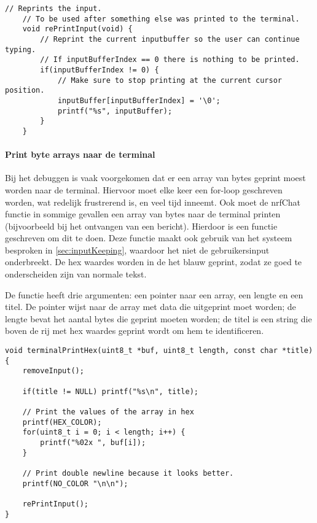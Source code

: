 \begin{lstlisting}[caption={De huidige input van de gebruiker opnieuw printen},captionpos=b,label={lst:reprintInput},style=c,xleftmargin=.\textwidth,xrightmargin=.\textwidth]
    // Reprints the input.
    // To be used after something else was printed to the terminal.
    void rePrintInput(void) {
        // Reprint the current inputbuffer so the user can continue typing.
        // If inputBufferIndex == 0 there is nothing to be printed.
        if(inputBufferIndex != 0) {
            // Make sure to stop printing at the current cursor position.
            inputBuffer[inputBufferIndex] = '\0';
            printf("%s", inputBuffer);
        }
    }
\end{lstlisting}

\paragraph{Print byte arrays naar de terminal}\label{sec:printStrex}
Bij het debuggen is vaak voorgekomen dat er een array van bytes geprint moest worden naar de terminal. Hiervoor moet elke keer een for-loop geschreven worden, wat redelijk frustrerend is, en veel tijd inneemt. Ook moet de nrfChat functie in sommige gevallen een array van bytes naar de terminal printen (bijvoorbeeld bij het ontvangen van een bericht). Hierdoor is een functie geschreven om dit te doen. Deze functie maakt ook gebruik van het systeem besproken in \autoref{sec:inputKeeping}, waardoor het niet de gebruikersinput onderbreekt. De hex waardes worden in de het blauw geprint, zodat ze goed te onderscheiden zijn van normale tekst.

De functie heeft drie argumenten: een pointer naar een array, een lengte en een titel. De pointer wijst naar de array met data die uitgeprint moet worden; de lengte bevat het aantal bytes die geprint moeten worden; de titel is een string die boven de rij met hex waardes geprint wordt om hem te identificeren.

\begin{lstlisting}[caption={Een hex string printen naar de terminal},captionpos=b,label={lst:terminalPrintHex},style=c,xleftmargin=.\textwidth,xrightmargin=.\textwidth]
void terminalPrintHex(uint8_t *buf, uint8_t length, const char *title) {
    removeInput();

    if(title != NULL) printf("%s\n", title);

    // Print the values of the array in hex
    printf(HEX_COLOR);
    for(uint8_t i = 0; i < length; i++) {
        printf("%02x ", buf[i]);
    }

    // Print double newline because it looks better.
    printf(NO_COLOR "\n\n");

    rePrintInput();
}
\end{lstlisting}

